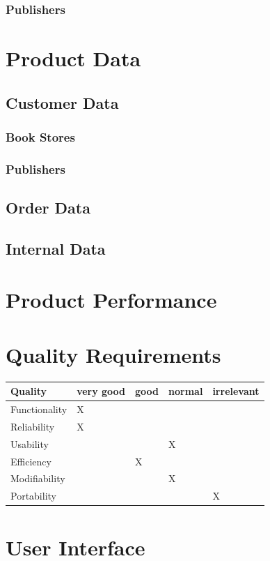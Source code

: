 \documentclass[11pt,a4paper,oneside,svgnames,draft]{report}
\begin{document}
\subsection{Publishers}

\chapter{Product Data}
\section{Customer Data}
\subsection{Book Stores}
\subsection{Publishers}
\section{Order Data}
\section{Internal Data}

\chapter{Product Performance}
\chapter{Quality Requirements}
\begin{table}[h!]
 \begin{tabular}{lllll}
  \hline
  Quality & very good & good & normal & irrelevant \\
  \hline
  Functionality & X & & & \\
  Reliability & X & & & \\
  Usability & & & X & \\
  Efficiency & & X & & \\
  Modifiability & & & X & \\
  Portability & & & & X \\
  \hline
 \end{tabular}
\end{table}

\chapter{User Interface}
\end{document}
